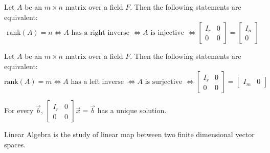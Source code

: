 \documentclass[
	11pt, %
	fleqn, %
	a4paper, %
]{LegrandOrangeBook}
\begin{document}
\begin{proposition}
    Let $A$ be an $m \times n$ matrix over a field $F$. Then the following statements are equivalent:
    \[
        \text{rank}(A) = n \iff A \text{ has a right inverse } \iff A \text{ is injective } \iff \begin{bmatrix}
            I_r & 0 \\
            0 & 0
        \end{bmatrix} = \begin{bmatrix}
            I_n \\
            0
        \end{bmatrix}
    \]
\end{proposition}

\begin{proposition}
    Let $A$ be an $m \times n$ matrix over a field $F$. Then the following statements are equivalent:
    \[
        \text{rank}(A) = m \iff A \text{ has a left inverse } \iff A \text{ is surjective } \iff \begin{bmatrix}
            I_r & 0 \\
            0 & 0
        \end{bmatrix} = \begin{bmatrix}
            I_m & 0
        \end{bmatrix}
    \]
\end{proposition}

\begin{proposition}
    For every $\vec{b}$, $\begin{bmatrix}
        I_r & 0 \\
        0 & 0
    \end{bmatrix} \vec{x} = \vec{b}$ has a unique solution.
\end{proposition}

Linear Algebra is the study of linear map between two finite dimensional vector spaces.

\begin{center}
\end{center}
\end{document}
